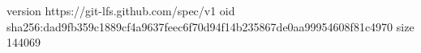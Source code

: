 version https://git-lfs.github.com/spec/v1
oid sha256:dad9fb359c1889cf4a9637feec6f70d94f14b235867de0aa99954608f81c4970
size 144069
